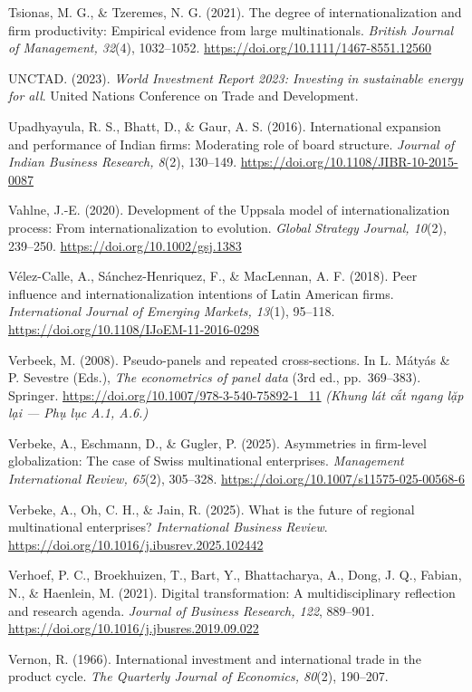 \documentclass[
  a4paper,
  13pt]{extreport}
\begin{document}
Tsionas, M. G., \& Tzeremes, N. G. (2021). The degree of
internationalization and firm productivity: Empirical evidence from
large multinationals. \emph{British Journal of Management, 32}(4),
1032--1052. \url{https://doi.org/10.1111/1467-8551.12560}

UNCTAD. (2023). \emph{World Investment Report 2023: Investing in
sustainable energy for all}. United Nations Conference on Trade and
Development.

Upadhyayula, R. S., Bhatt, D., \& Gaur, A. S. (2016). International
expansion and performance of Indian firms: Moderating role of board
structure. \emph{Journal of Indian Business Research, 8}(2), 130--149.
\url{https://doi.org/10.1108/JIBR-10-2015-0087}

Vahlne, J.-E. (2020). Development of the Uppsala model of
internationalization process: From internationalization to evolution.
\emph{Global Strategy Journal, 10}(2), 239--250.
\url{https://doi.org/10.1002/gsj.1383}

Vélez-Calle, A., Sánchez-Henriquez, F., \& MacLennan, A. F. (2018). Peer
influence and internationalization intentions of Latin American firms.
\emph{International Journal of Emerging Markets, 13}(1), 95--118.
\url{https://doi.org/10.1108/IJoEM-11-2016-0298}

Verbeek, M. (2008). Pseudo-panels and repeated cross-sections. In L.
Mátyás \& P. Sevestre (Eds.), \emph{The econometrics of panel data} (3rd
ed., pp.~369--383). Springer.
\url{https://doi.org/10.1007/978-3-540-75892-1_11} \emph{(Khung lát cắt
ngang lặp lại --- Phụ lục A.1, A.6.)}

Verbeke, A., Eschmann, D., \& Gugler, P. (2025). Asymmetries in
firm-level globalization: The case of Swiss multinational enterprises.
\emph{Management International Review, 65}(2), 305--328.
\url{https://doi.org/10.1007/s11575-025-00568-6}

Verbeke, A., Oh, C. H., \& Jain, R. (2025). What is the future of
regional multinational enterprises? \emph{International Business
Review}. \url{https://doi.org/10.1016/j.ibusrev.2025.102442}

Verhoef, P. C., Broekhuizen, T., Bart, Y., Bhattacharya, A., Dong, J.
Q., Fabian, N., \& Haenlein, M. (2021). Digital transformation: A
multidisciplinary reflection and research agenda. \emph{Journal of
Business Research, 122}, 889--901.
\url{https://doi.org/10.1016/j.jbusres.2019.09.022}

Vernon, R. (1966). International investment and international trade in
the product cycle. \emph{The Quarterly Journal of Economics, 80}(2),
190--207.
\end{document}
